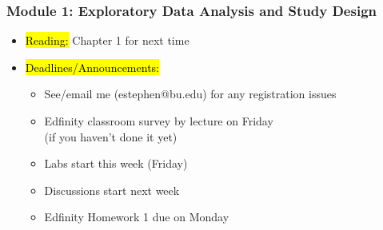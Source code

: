 
\begin{frame}
    \frametitle{Module 1: Exploratory Data Analysis and Study Design}
    \begin{itemize}
        \item \hl{Reading: }Chapter 1 for next time
        \item \hl{Deadlines/Announcements: }
        \begin{itemize}
            \item See/email me (estephen@bu.edu) for any registration issues
            \item Edfinity classroom survey by lecture on Friday \\
            (if you haven't done it yet)
            \item Labs start this week (Friday)
            \item Discussions start next week
            \item Edfinity Homework 1 due on Monday
        \end{itemize}
    \end{itemize}
    
\end{frame}
    